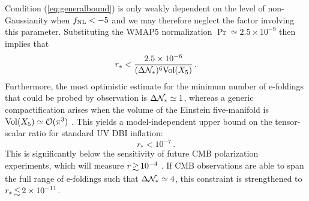 Condition (\ref{eq:generalbound}) is 
only weakly dependent on the level of non-Gaussianity 
when $f_{\mathrm{NL}} < -5$ and we may therefore neglect the 
factor involving this parameter. 
Substituting the WMAP5 normalization 
$\Pr \simeq 2.5 \times 10^{-9}$ then implies that
%  
\begin{equation}
\label{eq:upperbound}
r_{*} < \frac{2.5\times 10^{-6}}{( \Delta \mathcal{N}_*)^6 \mathrm{Vol}(X_5)} \,.
\end{equation}
% 
Furthermore, the most optimistic 
estimate for the minimum number of e-foldings that could be 
probed by observation is $\Delta \mathcal{N}_{*} \simeq 1$, whereas
a generic compactification arises when 
the volume of the Einstein five-manifold is $\mathrm{Vol}(X_5) 
\simeq {\cal{O}} (\pi^3)$ \cite{ks}. This yields a model-independent 
upper bound on the tensor-scalar ratio for standard UV DBI inflation:
%    
\begin{equation}
\label{eq:standardbound}
r_* < 10^{-7} \,.
\end{equation}
% 
This is significantly below the sensitivity 
of future CMB polarization experiments, which will measure 
${r} \, {\gsim} \, 10^{-4}$ \cite{clover,vpj}. 
If CMB  
observations are able to span the full range of e-foldings such that
$\Delta \mathcal{N}_* \simeq 4$, this constraint is strengthened to 
${r_*} \, {\lsim} \, {2 \times 10^{-11}}$.


